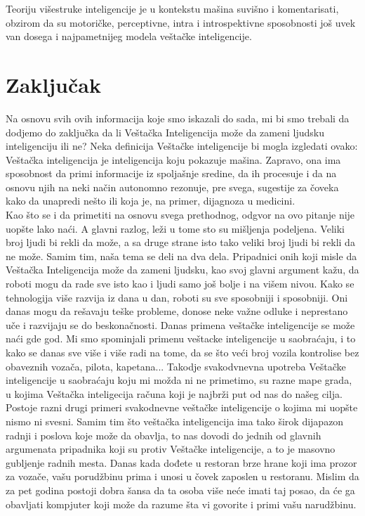 \documentclass[a4paper]{article}
\begin{document}
Teoriju višestruke inteligencije je u kontekstu mašina suvišno i komentarisati, obzirom da su motoričke, perceptivne, intra i introspektivne sposobnosti još uvek van dosega i najpametnijeg modela veštačke inteligencije.


\section{Zaključak}
\label{sec:zakljucak}

Na osnovu svih ovih informacija koje smo iskazali do sada, mi bi smo trebali da dodjemo do zaključka da li Veštačka Inteligencija može da zameni ljudsku inteligenciju ili ne? Neka definicija Veštačke inteligencije bi mogla izgledati ovako: Veštačka inteligencija je inteligencija koju pokazuje mašina. Zapravo, ona ima sposobnost da primi informacije iz spoljašnje sredine, da ih procesuje i da na osnovu njih na neki način autonomno rezonuje, pre svega, sugestije za čoveka kako da unapredi nešto ili koja je, na primer, dijagnoza u medicini.\\
Kao što se i da primetiti na osnovu svega prethodnog, odgvor na ovo pitanje nije uopšte lako naći. A glavni razlog, leži u tome sto su mišljenja podeljena. Veliki broj ljudi bi rekli da može, a sa druge strane isto tako veliki broj ljudi bi rekli da ne može. Samim tim, naša tema se deli na dva dela. Pripadnici onih koji misle da Veštačka Inteligencija može da zameni ljudsku, kao svoj glavni argument kažu, da roboti mogu da rade sve isto kao i ljudi samo još bolje i na višem nivou. Kako se tehnologija više razvija iz dana u dan, roboti su sve sposobniji i sposobniji. Oni danas mogu da rešavaju teške probleme, donose neke važne odluke i neprestano uče i razvijaju se do beskonačnosti. Danas primena veštačke inteligencije se može naći gde god. Mi smo spominjali primenu veštacke inteligencije u saobraćaju, i to kako se danas sve više i više radi na tome, da se što veći broj vozila kontrolise bez obaveznih vozača, pilota, kapetana... Takodje svakodvnevna upotreba Veštačke inteligencije u saobraćaju koju mi možda ni ne primetimo, su razne mape grada, u kojima Veštačka inteligecija računa koji je najbrži put od nas do našeg cilja. Postoje razni drugi primeri svakodnevne veštačke inteligencije o kojima mi uopšte nismo ni svesni. Samim tim što veštačka inteligencija ima tako širok dijapazon radnji i poslova koje može da obavlja, to nas dovodi do jednih od glavnih argumenata pripadnika koji su protiv Veštačke inteligencije, a to je masovno gubljenje radnih mesta. Danas kada dođete u restoran brze hrane koji ima prozor za vozače, vašu porudžbinu prima i unosi u čovek zaposlen u restoranu. Mislim da za pet godina postoji dobra šansa da ta osoba više neće imati taj posao, da će ga obavljati kompjuter koji može da razume šta vi govorite i primi vašu narudžbinu.\\
\end{document}

